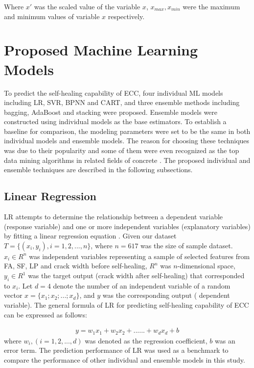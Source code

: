 \documentclass[11pt]{article}
\begin{document}
	
	Where $x'$ was the scaled value of the variable $x$, $x_{max}, x_{min}$ were the maximum and minimum values of variable $x$ respectively.
	

	
	
	
	\section{Proposed Machine Learning Models }
	\label{meth}
	

	
To predict the self-healing capability of ECC, four individual ML models including LR, SVR, BPNN and CART, and three ensemble methods including bagging, AdaBoost and stacking were proposed. Ensemble models were constructed using individual models as the base estimators. To establish a baseline for comparison, the modeling parameters were set to be the same in both individual models and ensemble models. The reason for choosing these techniques was due to their popularity and some of them were even recognized as the top data mining algorithms in related fields of concrete \cite{chou2014machine}. The proposed individual and ensemble techniques are described in the following subsections.
	
	
	\subsection{Linear Regression}
	
	LR attempts to determine the relationship between a dependent variable (response variable) and one or more independent variables (explanatory variables) by fitting a linear regression equation \cite{neter1996applied}. Given our dataset $T = \{ (x_i,y_i), i = 1,2,...,n\}$, where $n = 617$ was the size of sample dataset. $x_i \in R^n$ was independent variables representing a sample of selected features from FA, SF, LP and crack width before self-healing, $R^n$ was $n$-dimensional space, $y_i \in R^1$ was the target output (crack width after self-healing) that corresponded to $x_i$. Let $d = 4$ denote the number of an independent variable  of a random vector $x = \{ x_1;x_2;...;x_d \}$, and $y$ was the corresponding output ( dependent variable). The general formula of LR for predicting self-healing capability of ECC can be expressed as follows:
	
	\begin{eqnarray}
	y = w_1 x_1 + w_2 x_2 + ......+ w_d x_d +b                                                      
	\end{eqnarray}
	where $w_i, (i = 1,2,...,d)$ was denoted as the regression coefficient, $b$ was an error term. The prediction performance of LR was used as a benchmark to compare the performance of other individual and ensemble models in this study. 
	
\end{document}
